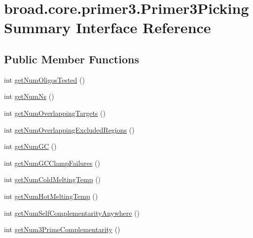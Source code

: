 \hypertarget{interfacebroad_1_1core_1_1primer3_1_1_primer3_picking_summary}{\section{broad.\+core.\+primer3.\+Primer3\+Picking\+Summary Interface Reference}
\label{interfacebroad_1_1core_1_1primer3_1_1_primer3_picking_summary}
}
\subsection*{Public Member Functions}
\begin{DoxyCompactItemize}
\item 
int \hyperlink{interfacebroad_1_1core_1_1primer3_1_1_primer3_picking_summary_afd6699d6613f8994a5671568840ce984}{get\+Num\+Oligos\+Tested} ()
\item 
int \hyperlink{interfacebroad_1_1core_1_1primer3_1_1_primer3_picking_summary_a19404fdd204f179bcb4fc58bc3b20900}{get\+Num\+Ns} ()
\item 
int \hyperlink{interfacebroad_1_1core_1_1primer3_1_1_primer3_picking_summary_a93ebd478c3f76036ec80a335b04ced68}{get\+Num\+Overlapping\+Targets} ()
\item 
int \hyperlink{interfacebroad_1_1core_1_1primer3_1_1_primer3_picking_summary_a0274c11847071145e95e07153084d6f4}{get\+Num\+Overlapping\+Excluded\+Regions} ()
\item 
int \hyperlink{interfacebroad_1_1core_1_1primer3_1_1_primer3_picking_summary_ac6b75a2de192bb0724f4aeee8efea571}{get\+Num\+G\+C} ()
\item 
int \hyperlink{interfacebroad_1_1core_1_1primer3_1_1_primer3_picking_summary_a0c5563c75d36a76f591e2436500c02fc}{get\+Num\+G\+C\+Clamp\+Failures} ()
\item 
int \hyperlink{interfacebroad_1_1core_1_1primer3_1_1_primer3_picking_summary_ac8ad89a533624b2f5d6f9752afd18cb8}{get\+Num\+Cold\+Melting\+Temp} ()
\item 
int \hyperlink{interfacebroad_1_1core_1_1primer3_1_1_primer3_picking_summary_abba1b8794f3326b08bfca5d433308fe3}{get\+Num\+Hot\+Melting\+Temp} ()
\item 
int \hyperlink{interfacebroad_1_1core_1_1primer3_1_1_primer3_picking_summary_a7711605db5d3a253742f4509932b9daf}{get\+Num\+Self\+Complementarity\+Anywhere} ()
\item 
int \hyperlink{interfacebroad_1_1core_1_1primer3_1_1_primer3_picking_summary_af4b53c02396212c708a6859dd802d550}{get\+Num3\+Prime\+Complementarity} ()

\end{DoxyCompactItemize}
